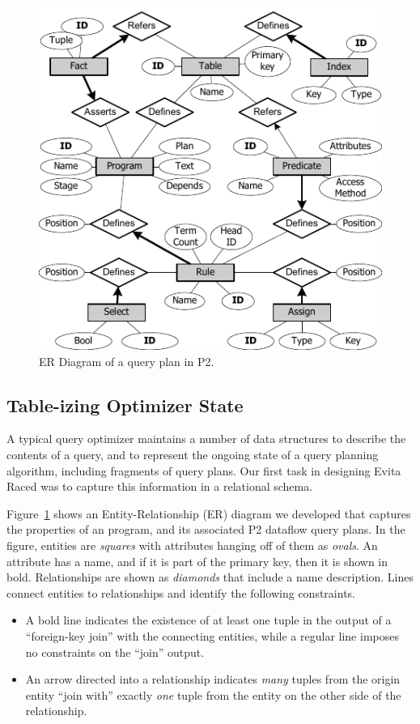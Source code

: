 \begin{figure}
\ssp
\begin{center}
\includegraphics[scale=1.2]{figures/ERDiagram}
\caption{ER Diagram of a query plan in P2.}
\label{ch:evita:fig:p2er}
\end{center}
\end{figure}

\subsection{Table-izing Optimizer State} 
\label{ch:evita:sec:catalog}

A typical query optimizer maintains a number of data structures to describe the
contents of a query, and to represent the ongoing state of a query planning
algorithm, including fragments of query plans.  Our first task in designing
Evita Raced was to capture this information in a relational schema.

Figure~\ref{ch:evita:fig:p2er} shows an Entity-Relationship (ER) diagram we
developed that captures the properties of an \OVERLOG program, and its
associated P2 dataflow query plans.  In the figure, entities are {\em squares} with
attributes hanging off of them as {\em ovals}.  An attribute has a name, and if it is
part of the primary key, then it is shown in bold.  Relationships are shown as
{\em diamonds} that include a name description.  Lines connect entities to relationships 
and identify the following constraints.
\begin{itemize}
  \item A bold line indicates the existence of at least one tuple in the output
    of a ``foreign-key join'' with the connecting entities, while a regular line
    imposes no constraints on the ``join'' output.
  \item An arrow directed into a relationship indicates {\em many} tuples from
    the origin entity ``join with'' exactly {\em one} tuple from the entity on
    the other side of the relationship.
\end{itemize}

